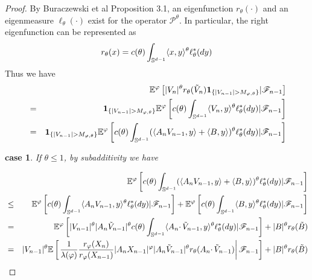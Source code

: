\documentclass[aoas,preprint]{imsart}
\newtheorem{case}{case}
\numberwithin{equation}{section}
\theoremstyle{plain}
\begin{document}
\begin{proof}
  By Buraczewski et al \cite{buraczewski:damek:guivarch:mentemeier:2014} 
  Proposition 3.1, an eigenfunction $r_\theta(\cdot)$ and an
  eigenmeasure $\ell_\theta(\cdot)$ exist for the operator
  $\mathscr P^\theta$. 
  In particular, the right eigenfunction can be represented as
  \[
  r_{\theta}(x) = c(\theta) \int_{\mathbb S^{d-1}} \langle x, y\rangle^\theta
  \ell^*_{\theta}(dy)
  \]
  Thus we have
  \begin{eqnarray}
    && \mathbb{E}^\varphi \left[ |V_n|^\theta r_{\theta}(\tilde V_n)
      \mathbf{1}_{\{|V_{n-1}| > M_{\varphi, \theta}\}} | \mathscr F_{n-1} \right]
    \label{eq:drift_proof_1} \\
    &=&
    \mathbf{1}_{\{|V_{n-1}| > M_{\varphi, \theta}\}}
    \mathbb{E}^\varphi
    \left[
      c(\theta)\int_{\mathbb S^{d-1}} \langle V_n, y\rangle^\theta \ell^*_{\theta}(dy)|
      \mathscr F_{n-1} \right]
    \nonumber \\
    &=&
    \mathbf{1}_{\{|V_{n-1}| > M_{\varphi, \theta}\}}
    \mathbb{E}^\varphi\left[c(\theta)\int_{\mathbb S^{d-1}} (\langle A_n V_{n-1}, y\rangle + \langle B,
        y\rangle)^\theta \ell^*_{\theta}(dy) | \mathscr F_{n-1} \right]
    \nonumber
  \end{eqnarray}
  \begin{case}
    If $\theta \leq 1$, by subadditivity we have
  \end{case}
  \begin{eqnarray*}
    &&\E^\varphi\left[c(\theta)\int_{\sphere^{d-1}} (\inn{A_n V_{n-1}, y} + \inn{B,
        y})^\theta \ell^*_{\theta}(dy) | \mathscr F_{n-1} \right]\\
    &\leq& \E^\varphi\left[c(\theta)\int_{\sphere^{d-1}} \inn{A_n V_{n-1}, y}^\theta
      \ell^*_{\theta}(dy) | \mathscr F_{n-1} \right]
    + \E^\varphi\left[c(\theta)\int_{\sphere^{d-1}} \inn{B, y}^\theta \ell^*_{\theta}(dy) |
      \mathscr F_{n-1} \right] \\
    &=&
    \E^\varphi\left[|V_{n-1}|^\theta |A_n \tilde V_{n-1}|^\theta
      c(\theta)\int_{\sphere^{d-1}}
      \inn{ A_n \cdotp \tilde V_{n-1}, y}^\theta
      \ell^*_{\theta}(dy) | \mathscr F_{n-1} \right]
    + |B|^\theta r_{\theta}(\tilde B)\\
    &=&
    |V_{n-1}|^\theta
    \E \left[
      \left.
        {1 \over \lambda(\varphi)}
        {
          r_\varphi(X_n)
          \over
          r_\varphi(X_{n-1})
        }
        | A_n X_{n-1} |^{\varphi}
        | A_n  \tilde V_{n-1} |^{\theta}
        r_\theta(A_n \cdotp \tilde V_{n-1})
      \right|
      \mathscr F_{n-1}
    \right]
    + |B|^\theta r_{\theta}(\tilde B) \\

\end{eqnarray*}
\end{proof}
\end{document}
